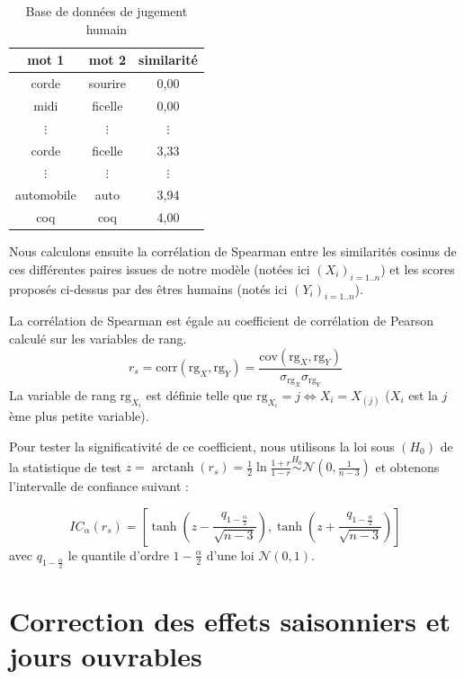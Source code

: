 \documentclass[11pt,french,french]{article}
\DeclareMathOperator{\arctanh}{arctanh}
\begin{document}
\begin{table}[!h]
\begin{center}
\begin{tabular}{|c|c|c|}
    \hline
    mot 1 & mot 2 & similarité  \tabularnewline
    \hline
    corde & sourire & 0,00   \tabularnewline
    midi & ficelle & 0,00   \tabularnewline
    $\vdots$  & $\vdots$  & $\vdots$    \tabularnewline
    corde & ficelle & 3,33   \tabularnewline
    $\vdots$  & $\vdots$  & $\vdots$    \tabularnewline
    automobile & auto & 3,94   \tabularnewline
    coq & coq & 4,00   \tabularnewline
    \hline
 \end{tabular}
\captionsetup{margin=0cm,format=hang,justification=justified}
\caption{Base de données de jugement humain}\label{table:human_judgement}
\end{center}
\end{table}

Nous calculons ensuite la corrélation de Spearman entre les similarités cosinus de ces différentes paires issues de notre modèle (notées ici \((X_i)_{i=1..n}\)) et les scores proposés ci-dessus par des êtres humains (notés ici \((Y_i)_{i=1..n}\)).

La corrélation de Spearman est égale au coefficient de corrélation de Pearson calculé sur les variables de rang.
\[
r_s = \mathrm{corr}(\mathrm{rg}_X, \mathrm{rg}_Y) = 
\frac{\mathrm{cov}(\mathrm{rg}_X, \mathrm{rg}_Y)}{
\sigma_{\mathrm{rg}_X} \sigma_{\mathrm{rg}_Y}
}
\]
La variable de rang \(\mathrm{rg}_{X_i}\) est définie telle que \(\mathrm{rg}_{X_i}=j \iff X_i = X_{(j)}\) (\(X_i\) est la \(j\)ème plus petite variable).

Pour tester la significativité de ce coefficient, nous utilisons la loi sous \((H_0)\) de la statistique de test \(z = \arctanh(r_s) = \frac{1}{2} \ln\frac{1+r}{1-r} \overset{H_0}{\sim}\mathcal{N}(0, \frac{1}{n-3})\) et obtenons l'intervalle de confiance suivant :

\[
IC_\alpha (r_s) = \left[\tanh\left(z-\frac{q_{1-\frac{\alpha}{2}}}{\sqrt{n-3}}\right),
\tanh\left(z+\frac{q_{1-\frac{\alpha}{2}}}{\sqrt{n-3}}\right)\right]
\]
avec \(q_{1-\frac{\alpha}{2}}\) le quantile d'ordre \(1-\frac{\alpha}{2}\) d'une loi \(\mathcal{N}(0, 1)\).

\newpage

\hypertarget{annexe:cvscjo}{%
\section{Correction des effets saisonniers et jours ouvrables}\label{annexe:cvscjo}}
\end{document}
